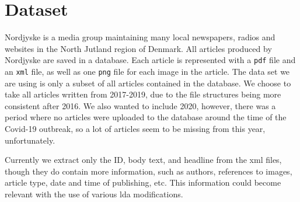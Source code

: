 \section{Dataset}
Nordjyske is a media group maintaining many local newspapers, radios and websites in the North Jutland region of Denmark.
All articles produced by Nordjyske are saved in a database.
Each article is represented with a \texttt{pdf} file and an \texttt{xml} file, as well as one \texttt{png} file for each image in the article.
The data set we are using is only a subset of all articles contained in the database.
We choose to take all articles written from 2017-2019, due to the file structures being more consistent after 2016.
We also wanted to include 2020, however, there was a period where no articles were uploaded to the database around the time of the Covid-19 outbreak, so a lot of articles seem to be missing from this year, unfortunately.

Currently we extract only the ID, body text, and headline from the xml files, though they do contain more information, such as authors, references to images, article type, date and time of publishing, etc.
This information could become relevant with the use of various \gls{lda} modifications.
